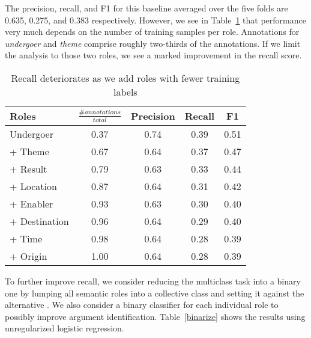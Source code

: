\documentclass{article} %
\def\func#1{\textrm{\bf{\sc{#1}}}}
\begin{document}
The precision, recall, and F1 for this baseline averaged over the five folds are 0.635, 0.275, and 0.383 respectively.  However, we see in Table~\ref{supervise} that performance very much depends on the number of training samples per role. Annotations for {\it undergoer} and {\it theme} comprise roughly two-thirds of the annotations.  If we limit the analysis to those two roles, we see a marked improvement in the recall score.
\begin{table}[ht]
\centering
\renewcommand{\arraystretch}{1.4}
\begin{tabular}{l c c c c} \toprule
Roles & $\frac{\# annotations}{total}$ & Precision & Recall & F1 \\ \midrule
Undergoer & 0.37 & 0.74 & 0.39 & 0.51 \\
+ Theme & 0.67 & 0.64 & 0.37 & 0.47 \\
+ Result & 0.79 & 0.63 & 0.33 & 0.44 \\
+ Location & 0.87 & 0.64 & 0.31 & 0.42 \\
+ Enabler & 0.93 & 0.63 & 0.30 & 0.40 \\
+ Destination & 0.96 & 0.64 & 0.29 & 0.40 \\
+ Time & 0.98 & 0.64 & 0.28 & 0.39 \\
+ Origin & 1.00 & 0.64 & 0.28 & 0.39 \\
\bottomrule
\end{tabular}
\caption{Recall deteriorates as we add roles with fewer training labels}\label{supervise}
\end{table}
 To further improve recall, we consider reducing the multiclass task into a binary one by lumping all semantic roles into a collective class \func{semantic} and setting it against the alternative \func{nonsemantic}.  We also consider a binary classifier for each individual role to possibly improve argument identification.  Table~\ref{binarize} shows the results using unregularized logistic regression.  
\end{document}
